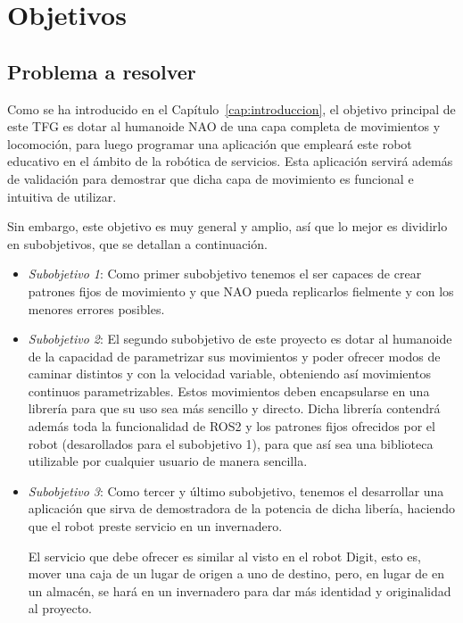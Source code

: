 \chapter{Objetivos}\label{cap:objetivos}

\section{Problema a resolver}

Como se ha introducido en el Capítulo~\ref{cap:introduccion}, el objetivo principal de este TFG es dotar al humanoide NAO de una capa completa de movimientos y locomoción, para luego programar una aplicación que empleará este robot educativo en el ámbito de la robótica de servicios. Esta aplicación servirá además de validación para demostrar que dicha capa de movimiento es funcional e intuitiva de utilizar.

Sin embargo, este objetivo es muy general y amplio, así que lo mejor es dividirlo en subobjetivos, que se detallan a continuación.

\begin{itemize}
    \item \textit{Subobjetivo 1}: Como primer subobjetivo tenemos el ser capaces de crear patrones fijos de movimiento y que NAO pueda replicarlos fielmente y con los menores errores posibles.
    \item \textit{Subobjetivo 2}: El segundo subobjetivo de este proyecto es dotar al humanoide de la capacidad de parametrizar sus movimientos y  poder ofrecer modos de caminar distintos y con la velocidad variable, obteniendo así movimientos continuos parametrizables. Estos movimientos deben encapsularse en una librería para que su uso sea más sencillo y directo. Dicha librería contendrá además toda la funcionalidad de ROS2 y los patrones fijos ofrecidos por el robot (desarollados para el subobjetivo 1), para que así sea una biblioteca utilizable por cualquier usuario de manera sencilla.
    \item \textit{Subobjetivo 3}: Como tercer y último subobjetivo, tenemos el desarrollar una aplicación que sirva de demostradora de la potencia de dicha libería, haciendo que el robot preste servicio en un invernadero.

    El servicio que debe ofrecer es similar al visto en el robot Digit, esto es, mover una caja de un lugar de origen a uno de destino, pero, en lugar de en un almacén, se hará en un invernadero para dar más identidad y originalidad al proyecto.
\end{itemize}

